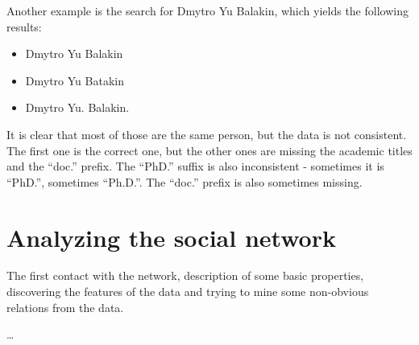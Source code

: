 Another example is the search for Dmytro Yu Balakin, which yields the following results:

\begin{itemize}
    \item Dmytro Yu Balakin
    \item Dmytro Yu Batakin
    \item Dmytro Yu. Balakin.
\end{itemize}

It is clear that most of those are the same person, but the data is not consistent. The first one is the correct one, but the other ones are missing the academic titles and the ``doc.'' prefix. The ``PhD.'' suffix is also inconsistent - sometimes it is ``PhD.'', sometimes ``Ph.D.''. The ``doc.'' prefix is also sometimes missing.

\section{Analyzing the social network}

The first contact with the network, description of some basic properties, discovering the features of the data and trying to mine some non-obvious relations from the data.

\dots